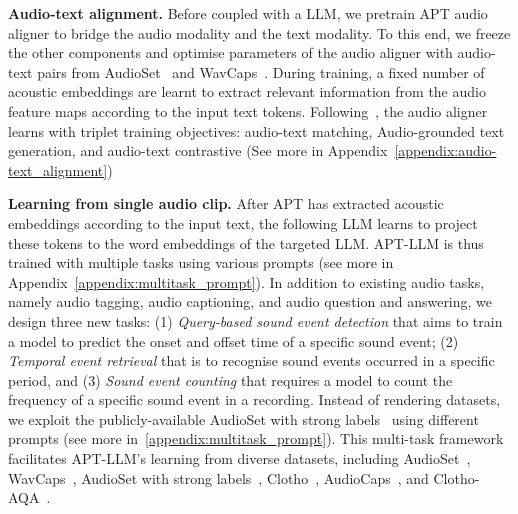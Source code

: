 \documentclass{article} %
\begin{document}
\textbf{Audio-text alignment.} Before coupled with a LLM, we pretrain APT audio aligner to bridge the audio modality and the text modality. To this end, we freeze the other components and optimise parameters of the audio aligner with audio-text pairs from AudioSet~\citep{gemmeke_audio_2017} and WavCaps~\citep{mei_wavcaps_2023}. During training, a fixed number of acoustic embeddings are learnt to extract relevant information from the audio feature maps according to the input text tokens. Following~\cite{li_blip-2_2023}, the audio aligner learns with triplet training objectives: audio-text matching, Audio-grounded text generation, and audio-text contrastive (See more in Appendix~\ref{appendix:audio-text_alignment})

\textbf{Learning from single audio clip.} 
After APT has extracted acoustic embeddings according to the input text, the following LLM learns to project these tokens to the word embeddings of the targeted LLM. APT-LLM is thus trained with multiple tasks using various prompts (see more in Appendix~\ref{appendix:multitask_prompt}). In addition to existing audio tasks, namely audio tagging, audio captioning, and audio question and answering, we design three new tasks: (1) \textit{Query-based sound event detection} that aims to train a model to predict the onset and offset time of a specific sound event; (2) \textit{Temporal event retrieval} that is to recognise sound events occurred in a specific period, and (3) \textit{Sound event counting} that requires a model to count the frequency of a specific sound event in a recording. Instead of rendering datasets, we exploit the publicly-available AudioSet with strong labels~\citep{hershey_benefit_2021} using different prompts (see more in~\ref{appendix:multitask_prompt}). This multi-task framework facilitates APT-LLM's learning from diverse datasets, including AudioSet~\citep{gemmeke_audio_2017}, WavCaps~\citep{mei_wavcaps_2023}, AudioSet with strong labels~\citep{hershey_benefit_2021}, Clotho~\citep{drossos_clotho_2020}, AudioCaps~\citep{kim_audiocaps_2019}, and Clotho-AQA~\citep{lipping_clotho-aqa_2022}.
\end{document}
